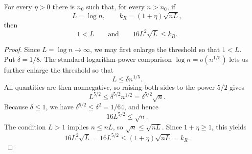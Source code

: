 \begin{helper}
For every \(\eta>0\) there is \(n_0\) such that, for every \(n>n_0\), if
\[
L=\log n,\qquad k_R=(1+\eta)\sqrt{nL},
\]
then
\[
1<L
\qquad\text{and}\qquad
16L^2\sqrt L\le k_R.
\]
\end{helper}
\begin{proof}
Since \(L=\log n\to\infty\), we may first enlarge the threshold so that
\(1<L\).  Put \(\delta=1/8\).  The standard logarithm-power comparison
\(\log n=o(n^{1/5})\) lets us further enlarge the threshold so that
\[
L\le \delta n^{1/5}.
\]
All quantities are then nonnegative, so raising both sides to the power
\(5/2\) gives
\[
L^{5/2}\le \delta^{5/2}n^{1/2}=\delta^{5/2}\sqrt n.
\]
Because \(\delta\le1\), we have \(\delta^{5/2}\le\delta^2=1/64\), and hence
\[
16L^{5/2}\le \sqrt n.
\]
The condition \(L>1\) implies \(n\le nL\), so \(\sqrt n\le\sqrt{nL}\).  Since
\(1+\eta\ge1\), this yields
\[
16L^2\sqrt L=16L^{5/2}
\le (1+\eta)\sqrt{nL}=k_R.
\]
\end{proof}
